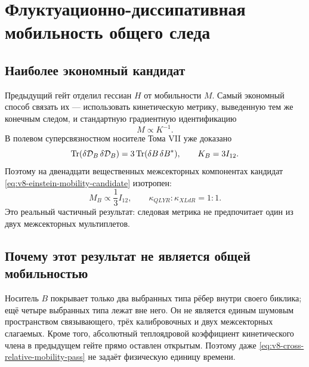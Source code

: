 \chapter{Флуктуационно-диссипативная мобильность общего следа}
\label{ch:v8-fluctuation-dissipation-mobility-origin-gate}

\section{Наиболее экономный кандидат}

Предыдущий гейт отделил гессиан $H$ от мобильности $M$. Самый экономный
способ связать их --- использовать кинетическую метрику, выведенную тем же
конечным следом, и стандартную градиентную идентификацию
\begin{equation}
 M\propto K^{-1}.
 \label{eq:v8-einstein-mobility-candidate}
\end{equation}
В полевом суперсвязностном носителе Тома VII уже доказано
\begin{equation}
 \operatorname{Tr}(\delta\mathcal D_B\,\delta\mathcal D_B)
 =3\operatorname{Tr}(\delta B\,\delta B^*),
 \qquad K_B=3I_{12}.
 \label{eq:v8-cross-field-trace-kinetic-metric}
\end{equation}
Поэтому на двенадцати вещественных межсекторных компонентах кандидат
\eqref{eq:v8-einstein-mobility-candidate} изотропен:
\begin{equation}
 M_B\propto\frac13I_{12},
 \qquad \kappa_{QLYR}:\kappa_{XLdR}=1:1.
 \label{eq:v8-cross-relative-mobility-pass}
\end{equation}
Это реальный частичный результат: следовая метрика не предпочитает один из
двух межсекторных мультиплетов.

\section{Почему этот результат не является общей мобильностью}

Носитель $B$ покрывает только два выбранных типа рёбер внутри своего
биклика; ещё четыре выбранных типа лежат вне него. Он не является единым
шумовым пространством связывающего, трёх калибровочных и двух межсекторных слагаемых.
Кроме того, абсолютный теплоядровой коэффициент кинетического члена в
предыдущем гейте прямо оставлен открытым. Поэтому даже
\eqref{eq:v8-cross-relative-mobility-pass} не задаёт физическую единицу
времени.


